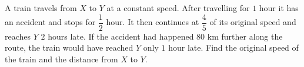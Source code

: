 A train travels from $X$ to $Y$ at a constant speed. After travelling for $1$ hour it has an accident and stops for $\dfrac12$ hour. It then continues at $\dfrac45$ of its original speed and reaches $Y$ $2$ hours late. If the accident had happened $80$ km further along the route, the train would have reached $Y$ only $1$ hour late. Find the original speed of the train and the distance from $X$ to $Y$.
